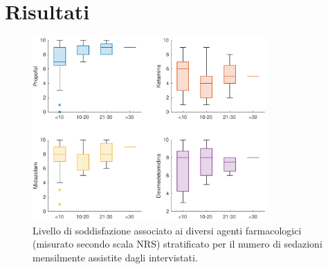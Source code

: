 \chapter{Risultati}

\begin{figure}[h]
    \centering
    \includegraphics[width=0.8\textwidth]{Figure/qualita-stratificata.pdf}
    \caption{Livello di soddisfazione associato ai diversi agenti farmacologici (misurato secondo scala NRS) stratificato per il numero di sedazioni mensilmente assistite dagli intervistati.}
    \label{fig:qualitastratificata}
\end{figure}